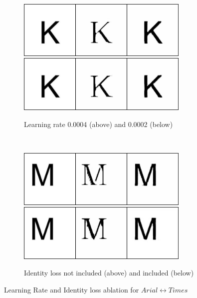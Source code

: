 \documentclass[10pt,twocolumn,letterpaper]{article}
\begin{document}
\begin{figure}[!htb]
     \centering
     \begin{subfigure}[]{0.49\textwidth}
         \centering
         \includegraphics[width=0.9\textwidth]{test_a_2_b_96}\\
         \vspace{0.3cm}
		 \includegraphics[width=0.9\textwidth]{test_a_2_b_96_g}\\
		 \caption{Learning rate 0.0004 (above) and 0.0002 (below)}
         \label{fig:a2f_lr}
     \end{subfigure}
     ~
     \begin{subfigure}[]{0.49\textwidth}
         \centering
         \includegraphics[width=0.9\textwidth]{test_a_2_b_115}\\
         \vspace{0.3cm}
		 \includegraphics[width=0.9\textwidth]{test_a_2_b_115_g}\\
		 \caption{Identity loss not included (above) and included (below)}
         \label{fig:a2f_id}
     \end{subfigure}

     \caption{Learning Rate and Identity loss ablation for $Arial \leftrightarrow Times$}
     \label{fig:ablation2}
\end{figure} 
\end{document}
